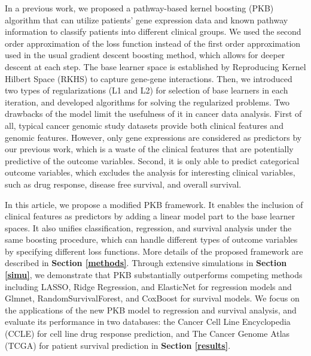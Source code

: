 \documentclass[a4paper,12pt]{article}
\begin{document}
In a previous work,\cite{zeng2019pathway} we proposed a pathway-based kernel boosting (PKB) algorithm that can utilize patients' gene expression data and known pathway information to classify patients into different clinical groups. We used the second order approximation of the loss function instead of the first order approximation used in the usual gradient descent boosting method, which allows for deeper descent at each step. The base learner space is established by Reproducing Kernel Hilbert Space (RKHS)\citep{friedman2001elements} to capture gene-gene interactions. Then, we introduced two types of regularizations (L1 and L2) for selection of base learners in each iteration, and developed algorithms for solving the regularized problems. Two drawbacks of the model limit the usefulness of it in cancer data analysis. First of all, typical cancer genomic study datasets provide both clinical features and genomic features. However, only gene expressions are considered as predictors by our previous work, which is a waste of the clinical features that are potentially predictive of the outcome variables. Second, it is only able to predict categorical outcome variables, which excludes the analysis for interesting clinical variables, such as drug response, disease free survival, and overall survival. 
	
In this article, we propose a modified PKB framework. It enables the inclusion of clinical features as predictors by adding a linear model part to the base learner spaces. It also unifies classification, regression, and survival analysis under the same boosting procedure, which can handle different types of outcome variables by specifying different loss functions. More details of the proposed framework are described in \textbf{Section \ref{methods}}. Through extensive simulations in \textbf{Section \ref{simu}}, we demonstrate that PKB substantially outperforms competing methods including LASSO,\cite{tibshirani1996regression} Ridge Regression,\cite{hoerl1970ridge} and ElasticNet\cite{zou2005regularization} for regression models and Glmnet,\cite{simon2011regularization} RandomSurvivalForest,\cite{ishwaran2008random} and CoxBoost\cite{binder2013coxboost} for survival models. We focus on the applications of the new PKB model to regression and survival analysis, and evaluate its performance in two databases:  the Cancer Cell Line Encyclopedia (CCLE) for cell line drug response prediction, and The Cancer Genome Atlas (TCGA) for patient survival prediction in \textbf{Section \ref{results}}.
\end{document}
